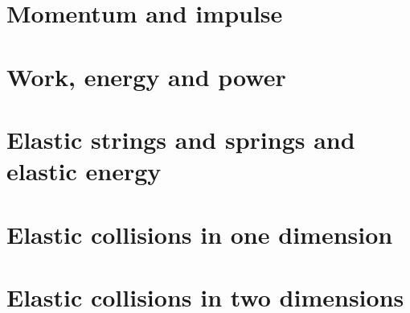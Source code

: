 \chapter{Momentum and impulse}


\chapter{Work, energy and power}


\chapter{Elastic strings and springs and elastic energy}


\chapter{Elastic collisions in one dimension}


\chapter{Elastic collisions in two dimensions}
